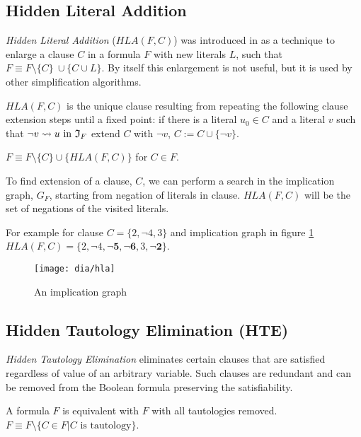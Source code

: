 \subsection{Hidden Literal Addition}

\emph{Hidden Literal Addition} ($HLA(F, C)$) was introduced in
\cite{Heule:2010:CEP:1928380.1928406} as a technique to enlarge a clause $C$
in a formula $F$ with new literals $L$, such that $F \equiv F \setminus \{C\} \
\cup \{ C \cup L \}$. By itself this enlargement is not useful, but it
is used by other simplification algorithms.

\begin{mydef}
  $HLA(F, C)$ is the unique clause resulting from repeating the following
  clause extension steps until a fixed point: if there is a literal $u_0 \in C$
  and a literal $v$ such that $\neg v \rightsquigarrow u \text{ in } \mathfrak{I}_F$
  extend $C$ with $\neg v$, $C := C \cup \{ \neg v \}$.
\end{mydef}

\begin{myprop}
  $F \equiv F \setminus \{C\} \cup \{HLA(F, C)\}$ for $C \in F$.
\end{myprop}

To find extension of a clause, $C$, we can perform a search in the implication
graph, $G_F$, starting from negation of literals in clause. $HLA(F, C)$ will
be the set of negations of the visited literals.

For example for clause $C = \{ 2, \neg 4, 3\}$
and implication graph in figure \ref{fig:hla}
$HLA(F, C) = \{2, \neg 4, \mathbf{\neg 5, \neg 6}, 3, \mathbf{\neg 2} \}$.

\begin{figure}
  \centering
  \texttt{[image: dia/hla]}
  \caption{An implication graph}
  \label{fig:hla}
\end{figure}


\subsection{Hidden Tautology Elimination (HTE)}
\label{ssec:hte}

\emph{Hidden Tautology Elimination} eliminates certain clauses that
are satisfied regardless of value of an arbitrary variable. Such
clauses are redundant and can be removed from the Boolean formula
preserving the satisfiability.

\begin{myprop}[TE]
  \label{myprop:removal-of-tautologies}
  A formula $F$ is equivalent with $F$ with all tautologies removed.
  $F \equiv F \setminus \{ C \in F | C \text{ is tautology}\}$.
\end{myprop}


